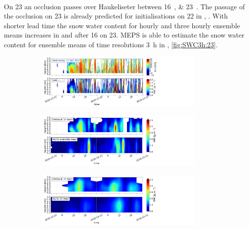 \\
On \SI{23}{\dec} an occlusion passes over Haukeliseter between \SIlist{16;23}{\UTC}. The passage of the occlusion on \SI{23}{\dec} is already predicted for initialisations on \SI{22}{\dec} in , . With shorter lead time the snow water content for hourly and three hourly ensemble means increases in  and  after \SI{16}{\UTC} on \SI{23}{\dec}. MEPS is able to estimate the snow water content for ensemble means of time resolutions \SI{3}{\hour} in , \ref{fig:SWC3h:23}.
\begin{figure}[H]
	\centering
	\begin{subfigure}[t]{1.05\textwidth}
		\centering
		\includegraphics[trim={0.cm 2.2cm 19.cm 0.5cm},clip,width=0.9\textwidth]{./fig_obs_ret/20161221}
		\caption{}\label{fig:SWC:ret_21}
	\end{subfigure}
	\begin{subfigure}[t]{1.05\textwidth}
		\centering
		\includegraphics[trim={0.cm 2.2cm 19.cm 0.5cm},clip,width=0.9\textwidth]{./fig_vert_SWC_EM/20161221}
		\caption{}\label{fig:SWC_EM:21}
	\end{subfigure}
	\begin{subfigure}[t]{1.05\textwidth}
		\centering
		\includegraphics[trim={0.cm 0.8cm 19.cm 0.5cm},clip,width=0.9\textwidth]{./fig_vert_SWC_3h/20161221}

\end{subfigure}
\end{figure}
